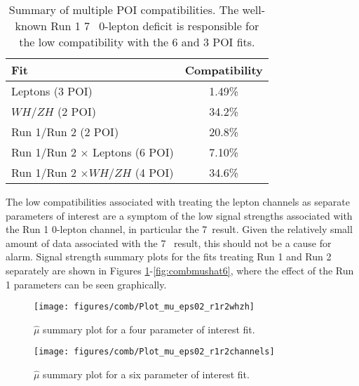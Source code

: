 \begin{table}[!htbp]\captionsetup{justification=centering}
\caption{Summary of multiple POI compatibilities.  The well-known Run 1 7 \tev\, 0-lepton deficit is responsible for the low compatibility with the 6 and 3 POI fits.}
\begin{center}\begin{tabular}{|l|c|}
\hline
Fit & Compatibility \\\hline
Leptons (3 POI) & 1.49\% \\
$WH/ZH$ (2 POI) & 34.2\% \\
Run 1/Run 2 (2 POI) & 20.8\% \\
Run 1/Run 2 $\times$ Leptons (6 POI) & 7.10\% \\
Run 1/Run 2 $\times WH/ZH$  (4 POI) & 34.6\% \\
\hline
\end{tabular}
\label{tab:compatibility}
\end{center}
\end{table}

The low compatibilities associated with treating the lepton channels as separate parameters of interest are a symptom of the low signal strengths associated with the Run 1 0-lepton channel, in particular the 7 \tev\,result.  Given the relatively small amount of data associated with the 7 \tev\, result, this should not be a cause for alarm.  Signal strength summary plots for the fits treating Run 1 and Run 2 separately are shown in Figures \ref{fig:combmushat4}-\ref{fig:combmushat6}, where the effect of the Run 1 parameters can be seen graphically.

\begin{figure}[!htbp]\captionsetup{justification=centering}
  \begin{center}
  \texttt{[image: figures/comb/Plot\_mu\_eps02\_r1r2whzh]}
  \caption{$\hat{\mu}$ summary plot for a four parameter of interest fit.}
  \label{fig:combmushat4}
  \end{center}
\end{figure}

\begin{figure}[!htbp]\captionsetup{justification=centering}
  \begin{center}
  \texttt{[image: figures/comb/Plot\_mu\_eps02\_r1r2channels]}
  \caption{$\hat{\mu}$ summary plot for a six parameter of interest fit.}
  \label{fig:combmushat5}
  \end{center}
\end{figure}


